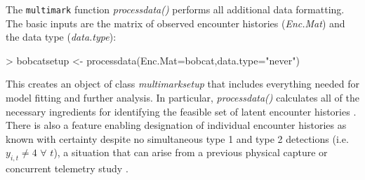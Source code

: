\documentclass[12pt]{article}
\begin{document}
The \verb|multimark| function \textit{processdata()} performs all additional data formatting. The basic inputs are the matrix of observed encounter histories (\textit{Enc.Mat}) and the data type (\textit{data.type}):
\begin{Schunk}
\begin{Sinput}
> bobcatsetup <- processdata(Enc.Mat=bobcat,data.type="never")
\end{Sinput}
\end{Schunk}
This creates an object of class \textit{multimarksetup} that includes everything needed for model fitting and further analysis. In particular, \textit{processdata()} calculates all of the necessary ingredients for identifying the feasible set of latent encounter histories \citep[for technical details see][]{BonnerHolmberg2013,McClintockEtAl2013a}. There is also a feature enabling designation of individual encounter histories as known with certainty despite no simultaneous type 1 and type 2 detections (i.e. $y_{i,t} \ne 4$ $\forall$ $t$), a situation that can arise from a previous physical capture or concurrent telemetry study \citep[e.g.][]{McClintockEtAl2013a}.
\end{document}
